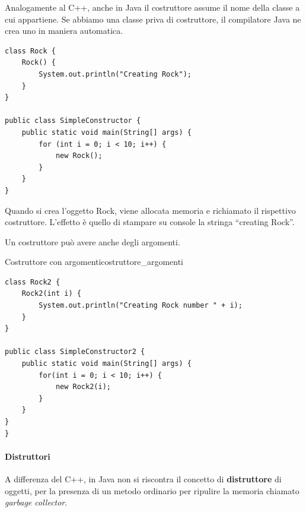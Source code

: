 \documentclass[12pt]{report}
\newcommand{\nmu}{}
\begin{document}
Analogamente al C++, anche in Java il costruttore assume il nome della classe a cui appartiene. Se abbiamo una classe priva di costruttore, il compilatore Java ne crea uno in maniera automatica.
\begin{example}{}{}
\begin{lstlisting}[style=javastyle]
class Rock {
	Rock() {
		System.out.println("Creating Rock");
	}
}

public class SimpleConstructor {
	public static void main(String[] args) {
		for (int i = 0; i < 10; i++) {
			new Rock();
		}
	}
}
\end{lstlisting}
\end{example}
Quando si crea l'oggetto Rock, viene allocata memoria e richiamato il rispettivo costruttore. L'effetto è quello di stampare su console la stringa ``creating Rock''.

Un costruttore può avere anche degli argomenti.
\begin{example}{\nmu Costruttore con argomenti}{costruttore_argomenti}
\begin{lstlisting}[style=javastyle]
class Rock2 {
	Rock2(int i) {
		System.out.println("Creating Rock number " + i);
	}
}

public class SimpleConstructor2 {
	public static void main(String[] args) {
		for(int i = 0; i < 10; i++) {
			new Rock2(i);
		}
	}
}
}
\end{lstlisting}
\end{example}
\paragraph{Distruttori} A differenza del C++, in Java non si riscontra il concetto di \textbf{distruttore} di oggetti, per la presenza di un metodo ordinario per ripulire la memoria chiamato \textit{garbage collector}.
\end{document}

